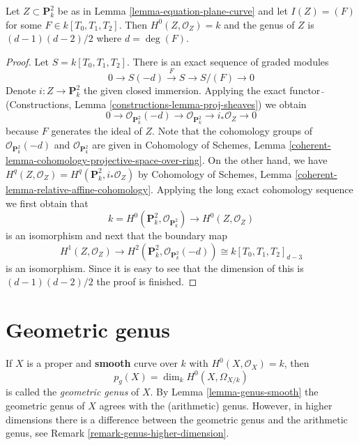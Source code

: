 \begin{lemma}
\label{lemma-genus-plane-curve}
Let $Z \subset \mathbf{P}^2_k$ be as in Lemma \ref{lemma-equation-plane-curve}
and let $I(Z) = (F)$ for some $F \in k[T_0, T_1, T_2]$.
Then $H^0(Z, \mathcal{O}_Z) = k$ and the genus of $Z$ is
$(d - 1)(d - 2)/2$ where $d = \deg(F)$.
\end{lemma}

\begin{proof}
Let $S = k[T_0, T_1, T_2]$.
There is an exact sequence of graded modules
$$
0 \to S(-d) \xrightarrow{F} S \to S/(F) \to 0
$$
Denote $i : Z \to \mathbf{P}^2_k$ the given closed immersion.
Applying the exact functor $\widetilde{\ }$
(Constructions, Lemma \ref{constructions-lemma-proj-sheaves})
we obtain
$$
0 \to \mathcal{O}_{\mathbf{P}^2_k}(-d) \to
\mathcal{O}_{\mathbf{P}^2_k} \to i_*\mathcal{O}_Z \to 0
$$
because $F$ generates the ideal of $Z$.
Note that the cohomology groups of $\mathcal{O}_{\mathbf{P}^2_k}(-d)$ and
$\mathcal{O}_{\mathbf{P}^2_k}$ are given in
Cohomology of Schemes, Lemma
\ref{coherent-lemma-cohomology-projective-space-over-ring}.
On the other hand, we have
$H^q(Z, \mathcal{O}_Z) = H^q(\mathbf{P}^2_k, i_*\mathcal{O}_Z)$ by
Cohomology of Schemes, Lemma \ref{coherent-lemma-relative-affine-cohomology}.
Applying the long exact cohomology sequence
we first obtain that
$$
k = H^0(\mathbf{P}^2_k, \mathcal{O}_{\mathbf{P}^2_k}) \longrightarrow
H^0(Z, \mathcal{O}_Z)
$$
is an isomorphism and next that the boundary map
$$
H^1(Z, \mathcal{O}_Z) \longrightarrow
H^2(\mathbf{P}^2_k, \mathcal{O}_{\mathbf{P}^2_k}(-d)) \cong
k[T_0, T_1, T_2]_{d - 3}
$$
is an isomorphism. Since it is easy to see that the dimension of this
is $(d - 1)(d - 2)/2$ the proof is finished.
\end{proof}








\section{Geometric genus}
\label{section-geometric-genus}

\noindent
If $X$ is a proper and {\bf smooth} curve over $k$ with
$H^0(X, \mathcal{O}_X) = k$, then
$$
p_g(X) = \dim_k H^0(X, \Omega_{X/k})
$$
is called the {\it geometric genus} of $X$. By Lemma \ref{lemma-genus-smooth}
the geometric genus of $X$ agrees with the (arithmetic) genus. However,
in higher dimensions there is a difference between the geometric genus
and the arithmetic genus, see Remark \ref{remark-genus-higher-dimension}.

